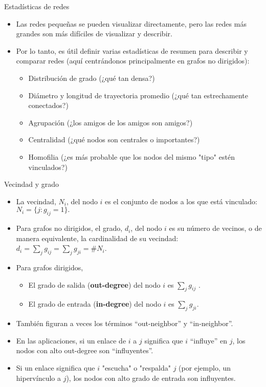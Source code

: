 \documentclass[11pt]{beamer}
\begin{document}
\begin{frame}{Estadísticas de redes}
    \begin{itemize}
        \item Las redes pequeñas se pueden visualizar directamente, pero las redes más grandes son más difíciles de visualizar y describir.
\item Por lo tanto, es útil definir varias estadísticas de resumen para describir y comparar redes (aquí centrándonos principalmente en grafos no dirigidos):
\begin{itemize}
\item Distribución de grado (¿qué tan densa?)
\item Diámetro y longitud de trayectoria promedio (¿qué tan estrechamente conectados?)
\item Agrupación (¿los amigos de los amigos son amigos?)
\item Centralidad (¿qué nodos son centrales o importantes?)
\item Homofilia (¿es más probable que los nodos del mismo "tipo" estén vinculados?)
\end{itemize}
    \end{itemize}
\end{frame}

\begin{frame}{Vecindad y grado}
\begin{itemize}
\item La vecindad, $N_i$, del nodo $i$ es el conjunto de nodos a los que está vinculado: $N_i = \{j : g_{ij} = 1\}.$
\item Para grafos no dirigidos, el grado, $d_i$, del nodo $i$ es su número de vecinos, o de manera equivalente, la cardinalidad de su vecindad: $d_i = \sum_j g_{ij} = \sum_j g_{ji} = \#N_i$.
\item Para grafos dirigidos,
\begin{itemize}
 \item El grado de salida (\textbf{out-degree}) del nodo $i$ es $\sum_j g_{ij}$ .
\item  El grado de entrada (\textbf{in-degree}) del nodo $i$ es $\sum_j g_{ji}$.
\end{itemize}
\item También figuran a veces los términos “out-neighbor” y “in-neighbor”.
\item En las aplicaciones, si un enlace de $i$ a $j$ significa que $i$ “influye” en $j$, los nodos con alto out-degree son “influyentes”.
\item Si un enlace significa que $i$ "escucha" o "respalda" $j$ (por ejemplo, un hipervínculo a $j$), los nodos con alto grado de entrada son influyentes.
    \end{itemize}
\end{frame}
\end{document}
